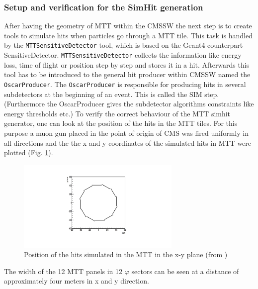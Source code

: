 		\subsubsection{Setup and verification for the SimHit generation}
			After having the geometry of MTT within the CMSSW the next step is to create tools to simulate hits when particles go through a MTT tile.
			This task is handled by the \verb+MTTSensitiveDetector+ tool, which is based on the Geant4 counterpart SensitiveDetector.
			\verb+MTTSensitiveDetector+ collects the information like energy loss, time of flight or position step by step and stores it in a hit.
			Afterwards this tool has to be introduced to the general hit producer within CMSSW named the \verb+OscarProducer+.
			The \verb+OscarProducer+ is responsible for producing hits in several subdetectors at the beginning of an event.
			This is called the SIM step.
			(Furthermore the OscarProducer gives the subdetector algorithms constraints like energy thresholds etc.)
			To verify the correct behaviour of the MTT simhit generator, one can look at the position of the hits in the MTT tiles.
			For this purpose a muon gun placed in the point of origin of CMS was fired uniformly in all directions and the the x and y coordinates of the simulated hits in MTT were plotted (Fig.
			\ref{fig:hitpos_mtt}).
			\begin{figure}[htbp]
				\centering
				\includegraphics[width=0.70\textwidth]{Figures/erdogan/hitpos_mtt.png}
				\caption{Position of the hits simulated in the MTT in the x-y plane (from \cite{paul_thesis})}
				\label{fig:hitpos_mtt}
			\end{figure}
			The width of the 12 MTT panels in 12 $\varphi$ sectors can be seen at a distance of approximately four meters in x and y direction.
